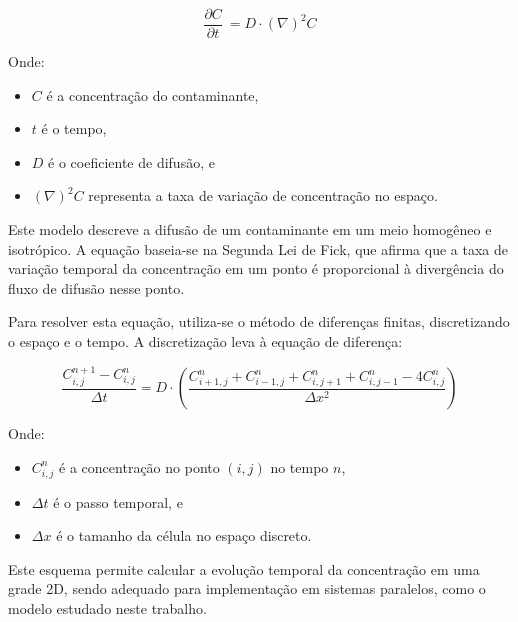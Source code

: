 \[\frac{\partial C}{\partial t}\ = D \cdot (\nabla)^{2} C \]

Onde:
\begin{itemize}
    \item \( C \) é a concentração do contaminante,
    \item \( t \) é o tempo,
    \item \( D \) é o coeficiente de difusão, e
    \item \( (\nabla)^{2} C \) representa a taxa de variação de concentração no espaço.
\end{itemize}

Este modelo descreve a difusão de um contaminante em um meio homogêneo e isotrópico. A equação baseia-se na Segunda Lei de Fick, que afirma que a taxa de variação temporal da concentração em um ponto é proporcional à divergência do fluxo de difusão nesse ponto.

Para resolver esta equação, utiliza-se o método de diferenças finitas, discretizando o espaço e o tempo. A discretização leva à equação de diferença:

\[
    \frac{C^{n+1}_{i,j} - C^{n}_{i,j}}{\Delta t} = D \cdot \left( \frac{C^{n}_{i+1,j} + C^{n}_{i-1,j} + C^{n}_{i,j+1} + C^{n}_{i,j-1} - 4C^{n}_{i,j}}{\Delta x^2} \right)
\]

Onde:
\begin{itemize}
    \item \( C^{n}_{i,j} \) é a concentração no ponto \( (i,j) \) no tempo \( n \),
    \item \( \Delta t \) é o passo temporal, e
    \item \( \Delta x \) é o tamanho da célula no espaço discreto.
\end{itemize}

Este esquema permite calcular a evolução temporal da concentração em uma grade 2D, sendo adequado para implementação em sistemas paralelos, como o modelo estudado neste trabalho.